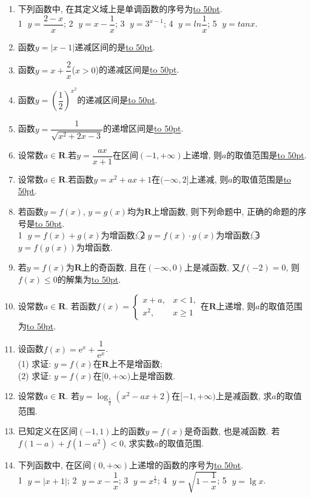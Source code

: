 \documentclass[10pt,a4paper]{article}
\newcommand{\blank}[1]{\underline{\hbox to #1pt{}}}
\begin{document}
\begin{enumerate}[1.]
\item 下列函数中, 在其定义域上是单调函数的序号为\blank{50}.\\
\textcircled{1} $y=\dfrac{2-x}x$; \textcircled{2} $y=x-\dfrac 1x$; \textcircled{3} $y={3^{x-1}}$; \textcircled{4} $y=ln\dfrac 1x$; \textcircled{5} $y=tanx$.
\item 函数$y=|x-1|$递减区间的是\blank{50}.
\item 函数$y=x+\dfrac 2x$($x>0$)的递减区间是\blank{50}.
\item 函数$y=(\dfrac 12)^{x^2}$的递减区间是\blank{50}.
\item 函数$y=\dfrac 1{\sqrt{x^2+2x-3}}$的递增区间是\blank{50}.
\item 设常数$a\in \mathbf{R}$.若$y=\dfrac{ax}{x+1}$在区间$(-1,+\infty)$上递增, 则$a$的取值范围是\blank{50}.
\item 设常数$a\in \mathbf{R}$.若函数$y=x^2+ax+1$在$(-\infty,2]$上递减, 则$a$的取值范围是\blank{50}.
\item 若函数$y=f(x)$, $y=g(x)$均为$\mathbf{R}$上增函数, 则下列命题中, 正确的命题的序号是\blank{50}.\\
\textcircled{1} $y=f(x)+g(x)$为增函数; \textcircled{2} $y=f(x)\cdot g(x)$为增函数; \textcircled{3} $y=f(g(x))$为增函数.
\item 若$y=f(x)$为$\mathbf{R}$上的奇函数, 且在$(-\infty,0)$上是减函数, 又$f(-2)=0$, 则$f(x)\le 0$的解集为\blank{50}.
\item 设常数$a\in \mathbf{R}$. 若函数$f(x)=\begin{cases} x+a,& x<1, \\ x^2,& x\ge 1 \end{cases}$在$\mathbf{R}$上递增, 则$a$的取值范围为\blank{50}.
\item 设函数$f(x)=\mathrm{e}^x+\dfrac 1{\mathrm{e}^x}$.\\
(1) 求证: $y=f(x)$在$\mathbf{R}$上不是增函数;\\
(2) 求证: $y=f(x)$在$[0,+\infty)$上是增函数.
\item 设常数$a\in \mathbf{R}$. 若$y=\log_{\frac 12}(x^2-ax+2)$在$[-1,+\infty)$上是减函数, 求$a$的取值范围.
\item 已知定义在区间$(-1,1)$上的函数$y=f(x)$是奇函数, 也是减函数. 若$f(1-a)+f(1-a^2)<0$, 求实数$a$的取值范围.
\item 下列函数中, 在区间$(0 ,+\infty)$上递增的函数的序号为\blank{50}.\\
\textcircled{1} $y=|x+1|$;  \textcircled{2} $y=x-\dfrac 1x$;    \textcircled{3} $y={x^{\frac 12}}$;    \textcircled{4} $y=\sqrt{1-\dfrac 1x}$; \textcircled{5} $y=\lg x$.

\end{enumerate}
\end{document}
